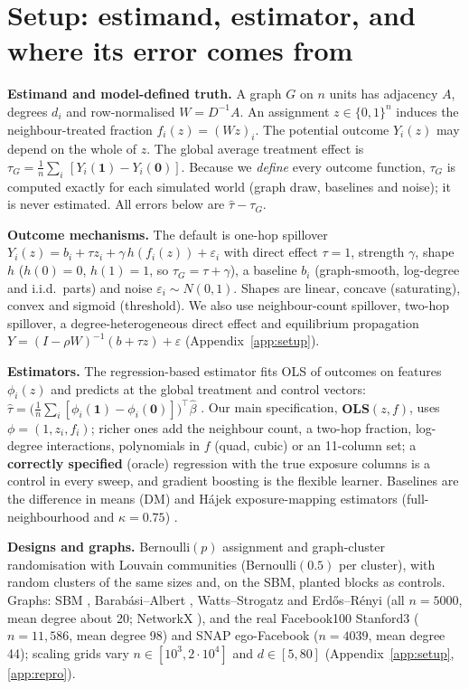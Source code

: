 \section{Setup: estimand, estimator, and where its error comes from}
\label{sec:setup}
\textbf{Estimand and model-defined truth.}
A graph $G$ on $n$ units has adjacency $A$, degrees $d_i$ and row-normalised $W=D^{-1}A$. An assignment $z\in\{0,1\}^n$ induces the
neighbour-treated fraction $f_i(z)=(Wz)_i$. The potential outcome $Y_i(z)$ may depend on the whole of $z$. The global average treatment effect is
$\tau_G=\frac1n\sum_i\,[Y_i(\mathbf 1)-Y_i(\mathbf 0)]$. Because we \emph{define} every outcome function, $\tau_G$ is computed exactly for each
simulated world (graph draw, baselines and noise); it is never estimated. All errors below are $\hat\tau-\tau_G$.

\textbf{Outcome mechanisms.}
The default is one-hop spillover $Y_i(z)=b_i+\tau z_i+\gamma\,h(f_i(z))+\varepsilon_i$ with direct effect $\tau=1$, strength $\gamma$, shape $h$ ($h(0)=0$, $h(1)=1$, so $\tau_G=\tau+\gamma$),
a baseline $b_i$ (graph-smooth, log-degree and i.i.d.\ parts) and noise $\varepsilon_i\sim N(0,1)$. Shapes are linear, concave (saturating), convex and sigmoid (threshold). We also use neighbour-count spillover, two-hop spillover, a degree-heterogeneous direct effect and
equilibrium propagation $Y=(I-\rho W)^{-1}(b+\tau z)+\varepsilon$ (Appendix~\ref{app:setup}).

\textbf{Estimators.}
The regression-based estimator fits OLS of outcomes on features $\phi_i(z)$ and predicts at the global treatment and control vectors:
$\hat\tau=\big(\tfrac1n\sum_i[\phi_i(\mathbf 1)-\phi_i(\mathbf 0)]\big)^{\!\top}\hat\beta$ \citep{chin2019,hanugander2023}.
Our main specification, \textbf{OLS$(z,f)$}, uses $\phi=(1,z_i,f_i)$; richer ones add the neighbour count, a two-hop fraction, log-degree
interactions, polynomials in $f$ (quad, cubic) or an 11-column set; a \textbf{correctly specified} (oracle) regression with the true
exposure columns is a control in every sweep, and gradient boosting is the flexible learner.
Baselines are the difference in means (DM) and Hájek exposure-mapping estimators (full-neighbourhood and $\kappa=0.75$) \citep{aronowsamii2017,chin2019}.

\textbf{Designs and graphs.}
Bernoulli$(p)$ assignment and graph-cluster randomisation with Louvain communities \citep{blondel2008} (Bernoulli$(0.5)$ per cluster), with random clusters of the same sizes and, on the SBM, planted blocks as controls.
Graphs: SBM \citep{holland1983}, Barab\'asi--Albert \citep{barabasi1999}, Watts--Strogatz \citep{watts1998} and Erd\H{o}s--R\'enyi (all $n=5000$, mean degree about 20; NetworkX \citep{hagberg2008}), and the real
Facebook100 Stanford3 \citep{traud2012,rossi2015} ($n=11{,}586$, mean degree 98) and SNAP ego-Facebook \citep{mcauley2012} ($n=4039$, mean degree 44); scaling grids vary $n\in[10^3,2\cdot10^4]$ and $d\in[5,80]$ (Appendix~\ref{app:setup}, \ref{app:repro}).

